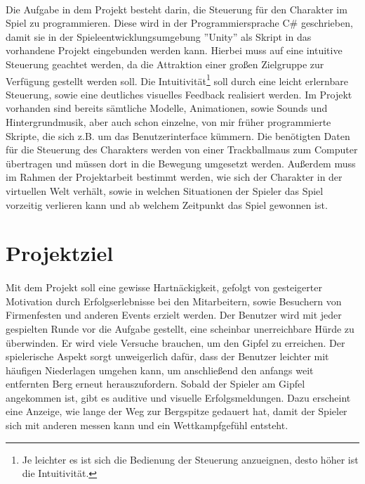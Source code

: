 \paragraph{}
Die Aufgabe in dem Projekt besteht darin, die Steuerung für den Charakter im Spiel zu programmieren. Diese wird in der Programmiersprache C\# geschrieben, damit sie in der Spieleentwicklungsumgebung ”Unity” als Skript in das vorhandene Projekt eingebunden werden kann. Hierbei muss auf eine intuitive Steuerung geachtet werden, da die Attraktion einer großen Zielgruppe zur Verfügung gestellt werden soll. Die Intuitivität\footnote{Je leichter es ist sich die Bedienung der Steuerung anzueignen, desto höher ist die Intuitivität.} soll durch eine leicht erlernbare Steuerung, sowie eine deutliches visuelles Feedback realisiert werden. Im Projekt vorhanden sind bereits sämtliche Modelle, Animationen, sowie Sounds und Hintergrundmusik, aber auch schon einzelne, von mir früher programmierte Skripte, die sich z.B. um das Benutzerinterface kümmern. Die benötigten Daten für die Steuerung des Charakters werden von einer Trackballmaus zum Computer übertragen und müssen dort in die Bewegung umgesetzt werden. Außerdem muss im Rahmen der Projektarbeit bestimmt werden, wie sich der Charakter in der virtuellen Welt verhält, sowie in welchen Situationen der Spieler das Spiel vorzeitig verlieren kann und ab welchem Zeitpunkt das Spiel gewonnen ist.

\section{Projektziel}
\paragraph{}
Mit dem Projekt soll eine gewisse Hartnäckigkeit, gefolgt von gesteigerter Motivation durch Erfolgserlebnisse bei den Mitarbeitern, sowie Besuchern von Firmenfesten und anderen Events erzielt werden. Der Benutzer wird mit jeder gespielten Runde vor die Aufgabe gestellt, eine scheinbar unerreichbare Hürde zu überwinden. Er wird viele Versuche brauchen, um den Gipfel zu erreichen. Der spielerische Aspekt sorgt unweigerlich dafür, dass der Benutzer leichter mit häufigen Niederlagen umgehen kann, um anschließend den anfangs weit entfernten Berg erneut herauszufordern. Sobald der Spieler am Gipfel angekommen ist, gibt es auditive und visuelle Erfolgsmeldungen. Dazu erscheint eine Anzeige, wie lange der Weg zur Bergspitze gedauert hat, damit der Spieler sich mit anderen messen kann und ein Wettkampfgefühl entsteht.

